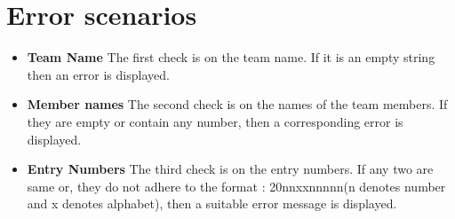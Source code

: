\documentclass{article}
\begin{document}



\section{Error scenarios}
\begin{itemize}
\item \textbf{Team Name} The first check is on the team name. If it is an empty string then an error is displayed.
\item \textbf{Member names} The second check is on the names of the team members. If they are empty or contain any number, then a corresponding error is displayed.
\item \textbf{Entry Numbers} The third check is on the entry numbers. If any two are same or, they do not adhere to the format : 20nnxxnnnnn(n denotes number and x denotes alphabet), then a suitable error message is displayed.
\end{itemize}
\end{document}
